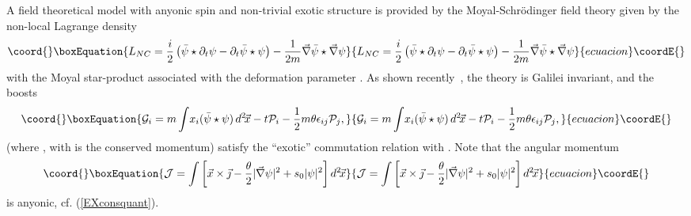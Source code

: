 \documentclass[a4paper,11pt]{article}
\providecommand{\vx}{{\vec x}}
\def\p{{\partial}}
\def\vj{{\vec\jmath}}
\def\vj{{\vec\jmath}}
\def\vx{{\vec x}}
\def\vnabla{{\vec\nabla}}
\begin{document}
A field theoretical model with anyonic spin and non-trivial exotic
structure is provided by
the Moyal-Schr\"odinger field theory \cite{MoyalFT} given by the
non-local Lagrange density
\begin{equation}\coord{}\boxEquation{
L_{NC}=
\frac{i}{2}\left(\bar{\psi}\star\p_t\psi-
\p_t\bar{\psi}\star\psi\right)
-
\frac{1}{2m}\vnabla\bar{\psi}\star\vnabla\psi
\label{freeNClag}
}{
L_{NC}=
\frac{i}{2}\left(\bar{\psi}\star\p_t\psi-
\p_t\bar{\psi}\star\psi\right)
-
\frac{1}{2m}\vnabla\bar{\psi}\star\vnabla\psi
}{ecuacion}\coordE{}\end{equation}
with the Moyal star-product associated with the deformation
parameter \myHighlight{$\theta$}\coordHE{}. As shown recently~\cite{HoMa},
the theory is Galilei invariant, and the boosts
\begin{equation}\coord{}\boxEquation{
     {\cal G}_{i}=m\int\!x_{i}(\bar{\psi}\star\psi)\, d^{2}\!\vx
     -t{\cal P}_{i}
     -\frac{1}{2} m\theta\epsilon_{ij}{\cal P}_{j},
     \label{xboost}
}{
     {\cal G}_{i}=m\int\!x_{i}(\bar{\psi}\star\psi)\, d^{2}\!\vx
     -t{\cal P}_{i}
     -\frac{1}{2} m\theta\epsilon_{ij}{\cal P}_{j},
     }{ecuacion}\coordE{}\end{equation}
(where
\myHighlight{$
\vec{\displaystyle{\cal P}}=\displaystyle{\int}\vj\,d^{2}\!\vx
$}\coordHE{}, with
\myHighlight{$
\vj=
\big[\bar{\psi}(\vnabla\psi)-(\vnabla\bar{\psi})\psi\big]/(2i)
$}\coordHE{}
is the conserved momentum) satisfy the ``exotic'' commutation relation
\myHighlight{$\{{\cal G}_1,{\cal G}_2\}=-\kappa\int\vert\psi\vert^2d^{2}\!\vx$}\coordHE{} with
\coordHE{}.
Note that the angular momentum
  \begin{equation}\coord{}\boxEquation{
     {\cal J}=
     \int\left[\vx\times\vec{\jmath}
     -\frac{\theta}{2}\vert\vnabla{\psi}\vert^2
     +s_0\vert\psi\vert^2
     \right] d^{2}\!\vx
     \label{xangmom}
}{
     {\cal J}=
     \int\left[\vx\times\vec{\jmath}
     -\frac{\theta}{2}\vert\vnabla{\psi}\vert^2
     +s_0\vert\psi\vert^2
     \right] d^{2}\!\vx
     }{ecuacion}\coordE{}\end{equation}
is anyonic, cf. (\ref{EXconsquant}).
\end{document}
